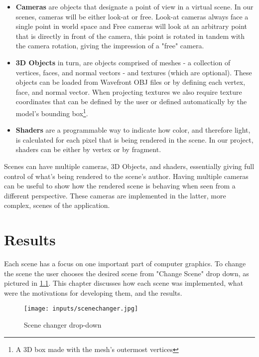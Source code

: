 \documentclass[cic,tc,english]{iiufrgs}
\begin{document}
\begin{itemize}
\item \textbf{Cameras} are objects that designate a point of view in a virtual scene. In our scenes, cameras will be either look-at or free. Look-at cameras always face a single point in world space and Free cameras will look at an arbitrary point that is directly in front of the camera, this point is rotated in tandem with the camera rotation, giving the impression of a "free" camera.

\item \textbf{3D Objects} in turn, are objects comprised of meshes - a collection of vertices, faces, and normal vectors - and textures (which are optional). These objects can be loaded from Wavefront OBJ files or by defining each vertex, face, and normal vector. When projecting textures we also require texture coordinates that can be defined by the user or defined automatically by the model's bounding box\footnote{A 3D box made with the mesh's outermost vertices}.

\item \textbf{Shaders} are a programmable way to indicate how color, and therefore light, is calculated for each pixel that is being rendered in the scene. In our project, shaders can be either by vertex or by fragment.
\end{itemize}

Scenes can have multiple cameras, 3D Objects, and shaders, essentially giving full control of what's being rendered to the scene's author. Having multiple cameras can be useful to show how the rendered scene is behaving when seen from a different perspective. These cameras are implemented in the latter, more complex, scenes of the application.




\chapter{Results}
Each scene has a focus on one important part of computer graphics. To change the scene the user chooses the desired scene from "Change Scene" drop down, as pictured in \cref{scenechangerdropdown}. This chapter discusses how each scene was implemented, what were the motivations for developing them, and the results.

\begin{figure}[h!]
    \caption{Scene changer drop-down}
    \begin{center}
        \texttt{[image: inputs/scenechanger.jpg]}
    \end{center}
    \label{scenechangerdropdown}
\end{figure}
\end{document}
